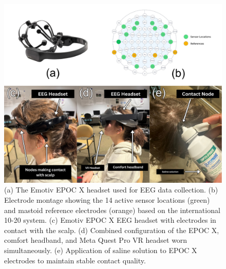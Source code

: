 \documentclass[utf8]{FrontiersinHarvard} %
\begin{document}
\begin{figure}[ht]
\begin{center}
\includegraphics[width=15cm]{figures/epocsetup.jpg}
\end{center}
\caption{(a) The Emotiv EPOC X headset used for EEG data collection. (b) Electrode montage showing the 14 active sensor locations (green) and mastoid reference electrodes (orange) based on the international 10-20 system. (c) Emotiv EPOC X EEG headset with electrodes in contact with the scalp. (d) Combined configuration of the EPOC X, comfort headband, and Meta Quest Pro VR headset worn simultaneously. (e) Application of saline solution to EPOC X electrodes to maintain stable contact quality.}\label{fig:epocsetup}
\end{figure}
\end{document}

